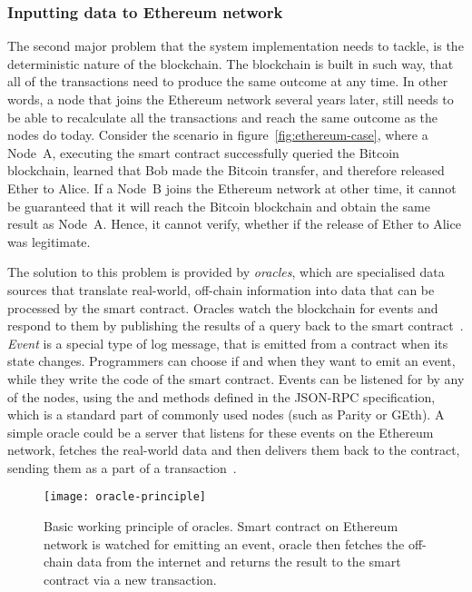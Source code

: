 \subsubsection{Inputting data to Ethereum network}
The second major problem that the system implementation needs to tackle, is the deterministic nature of the blockchain. The blockchain is built in such way, that all of the transactions need to produce the same outcome at any time. In other words, a node that joins the Ethereum network several years later, still needs to be able to recalculate all the transactions and reach the same outcome as the nodes do today. Consider the scenario in figure~\ref{fig:ethereum-case}, where a Node~A, executing the smart contract successfully queried the Bitcoin blockchain, learned that Bob made the Bitcoin transfer, and therefore released Ether to Alice. If a Node~B joins the Ethereum network at other time, it cannot be guaranteed that it will reach the Bitcoin blockchain and obtain the same result as Node~A. Hence, it cannot verify, whether if the release of Ether to Alice was legitimate.

The solution to this problem is provided by \textit{oracles}, which are specialised data sources that translate real-world, off-chain information into data that can be processed by the smart contract. Oracles watch the blockchain for events and respond to them by publishing the results of a query back to the smart contract~\cite{JohnWeldon2016BuildingContract}. \textit{Event} is a special type of log message, that is emitted from a contract when its state changes. Programmers can choose if and when they want to emit an event, while they write the code of the smart contract. Events can be listened for by any of the nodes, using the  and  methods defined in the JSON-RPC specification\footnotemark, which is a standard part of commonly used nodes (such as Parity or GEth). A simple oracle could be a server that listens for these events on the Ethereum network, fetches the real-world data and then delivers them back to the contract, sending them as a part of a transaction~\cite{JulesDourlens2017Oracles:Blockchain, 2018OraclizeDocumentation}. 
% 
% 
\begin{figure}[ht]
    \centering
    \texttt{[image: oracle-principle]}
    \caption{Basic working principle of oracles. Smart contract on Ethereum network is watched for emitting an event, oracle then fetches the off-chain data from the internet and returns the result to the smart contract via a new transaction.}
    \label{fig:oracles-principle}
\end{figure}


